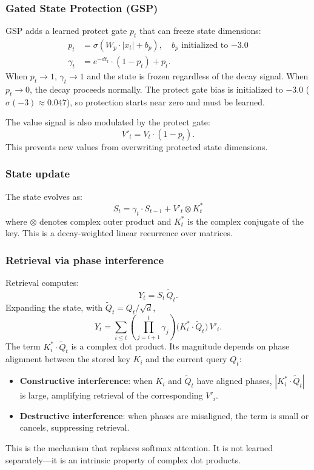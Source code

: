 \documentclass[11pt]{article}
\begin{document}
\subsubsection{Gated State Protection (GSP)}
GSP adds a learned protect gate $p_t$ that can freeze state dimensions:
\begin{align}
  p_t &= \sigma(W_p \cdot |x_t| + b_p), \quad b_p \text{ initialized to } {-3.0} \\
  \gamma_t &= e^{-dt_t} \cdot (1 - p_t) + p_t .
\end{align}
When $p_t \to 1$, $\gamma_t \to 1$ and the state is frozen regardless of the decay signal. When $p_t \to 0$, the decay proceeds normally. The protect gate bias is initialized to $-3.0$ ($\sigma(-3) \approx 0.047$), so protection starts near zero and must be learned.

The value signal is also modulated by the protect gate:
\begin{equation}
  V'_t = V_t \cdot (1 - p_t) .
\end{equation}
This prevents new values from overwriting protected state dimensions.

\subsubsection{State update}
The state evolves as:
\begin{equation}
  S_t = \gamma_t \cdot S_{t-1} + V'_t \otimes K_t^*
\end{equation}
where $\otimes$ denotes complex outer product and $K_t^*$ is the complex conjugate of the key. This is a decay-weighted linear recurrence over matrices.

\subsubsection{Retrieval via phase interference}
\label{sec:pam-retrieval}
Retrieval computes:
\begin{equation}
  Y_t = S_t \, \tilde{Q}_t .
\end{equation}
Expanding the state, with $\tilde{Q}_t = Q_t/\sqrt{d}$,
\begin{equation}
  Y_t = \sum_{i \leq t} \left(\prod_{j=i+1}^{t} \gamma_j\right) \bigl(K_i^* \cdot \tilde{Q}_t\bigr) \, V'_i .
\label{eq:pam-expand}
\end{equation}
The term $K_i^* \cdot \tilde{Q}_t$ is a complex dot product. Its magnitude depends on phase alignment between the stored key $K_i$ and the current query $Q_t$:
\begin{itemize}
  \item \textbf{Constructive interference}: when $K_i$ and $\tilde{Q}_t$ have aligned phases, $|K_i^* \cdot \tilde{Q}_t|$ is large, amplifying retrieval of the corresponding $V'_i$.
  \item \textbf{Destructive interference}: when phases are misaligned, the term is small or cancels, suppressing retrieval.
\end{itemize}
This is the mechanism that replaces softmax attention. It is not learned separately---it is an intrinsic property of complex dot products.
\end{document}
